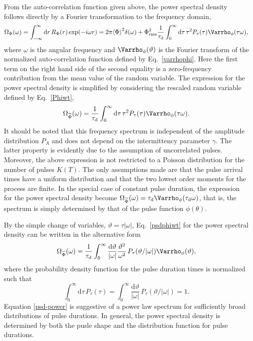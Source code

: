 \documentclass[aps,prb,12pt,a4paper,preprint,amsmath,amssymb,groupedaddress]{revtex4-1}
\newcommand{\wt}{\widetilde}
\newcommand{\ave}[1]{{\left<#1\right>}}
\newcommand{\abs}[1]{{\left|#1\right|}}\newcommand{\order}[1]{{\mathcal{O}\left(#1\right)}}
\newcommand{\rmd}{\text{d}}
\newcommand{\taud}{\ensuremath{\tau_\text{d}}}
\newcommand{\Phiave}{\ensuremath{\ave{\Phi}}}
\newcommand{\Phirms}{\ensuremath{\Phi}_\text{rms}}
\newcommand{\Phiwt}{\ensuremath{\widetilde{\Phi}}}
\newcommand{\Eqref}[1]{Eq.~\eqref{#1}}
\begin{document}
From the auto-correlation function given above, the power spectral density follows directly by a Fourier transformation to the frequency domain,\cite{garcia-phpl}
\begin{equation}
\Omega_\Phi(\omega) = \int_{-\infty}^\infty \rmd r\,R_\Phi(r)\exp(-i\omega r) = 2\pi\Phiave^2\delta(\omega) + \Phirms^2\frac{1}{\taud}\int_0^\infty \rmd\tau\,\tau^2 P_\tau(\tau)\Varrho_\phi(\tau\omega) ,
\end{equation}
where $\omega$ is the angular frequency and $\Varrho_\phi(\vartheta)$ is the Fourier transform of the normalized auto-correlation function defined by \Eqref{varrhophi}. Here the first term on the right hand side of the second equality is a zero-frequency contribution from the mean value of the random variable. The expression for the power spectral density is simplified by considering the rescaled random variable defined by \Eqref{Phiwt},
\begin{equation}\label{psdphiwt}
\Omega_{\wt{\Phi}}(\omega) = \frac{1}{\taud}\int_0^\infty \rmd\tau\,\tau^2 P_\tau(\tau) \Varrho_\phi(\tau\omega) .
\end{equation}
It should be noted that this frequency spectrum is independent of the amplitude distribution $P_A$ and does not depend on the intermittency parameter $\gamma$. The latter property is evidently due to the assumption of uncorrelated pulses. Moreover, the above expression is not restricted to a Poisson distribution for the number of pulses $K(T)$. The only assumptions made are that the pulse arrival times have a uniform distribution and that the two lowest order moments for the process are finite. In the special case of constant pulse duration, the expression for the power spectral density become $\Omega_{\Phiwt}(\omega)=\taud\Varrho_\phi(\taud\omega)$, that is, the spectrum is simply determined by that of the pulse function $\phi(\theta)$.


By the simple change of variables, $\vartheta=\tau\abs{\omega}$, \Eqref{psdphiwt} for the power spectral density can be written in the alternative form
\begin{equation}\label{psd-power}
\Omega_{\Phiwt}(\omega) = \frac{1}{\taud}\int_0^\infty \frac{\rmd\vartheta}{\abs{\omega}}\frac{\vartheta^2}{\omega^2}\,P_\tau(\vartheta/\abs{\omega})\Varrho_\phi(\vartheta) , 
\end{equation}
where the probability density function for the pulse duration times is normalized such that
\begin{equation}
\int_0^\infty \rmd\tau\,P_\tau(\tau) = \int_0^\infty \frac{\rmd\vartheta}{\abs{\omega}}\,P_\tau(\vartheta/\abs{\omega}) = 1 .
\end{equation}
Equation \eqref{psd-power} is suggestive of a power law spectrum for sufficiently broad distributions of pulse durations. In general, the power spectral density is determined by both the pusle shape and the distribution function for pulse durations.\cite{garcia-phpl}
\end{document}
